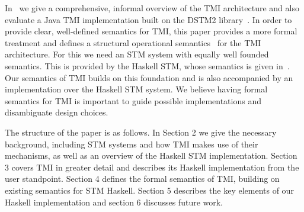 In~\cite{tmi} we give a comprehensive, informal overview of the TMI architecture and also evaluate 
a Java TMI implementation built on the DSTM2 library~\cite{hlm06}.
In order to provide clear, well-defined semantics for TMI, this paper provides a more
formal treatment and defines a structural operational semantics~\cite{plotkin_04_structural} 
for the TMI architecture.
For this we need an STM system with equally well founded semantics. This is provided by the Haskell
STM, whose semantics is given in~\cite{haskellstm}. Our semantics of TMI builds on this foundation
and is also accompanied by an implementation over the Haskell STM system. We believe having formal
semantics for TMI is important to guide possible implementations and disambiguate design choices.

The structure of the paper is as follows. In Section 2 we give the necessary background, including
STM systems and how TMI makes use of their mechanisms, as well as an overview of the Haskell STM
implementation. Section 3 covers TMI in greater detail and describes its Haskell implementation
from the user standpoint. Section 4 defines the formal semantics of TMI, building on existing
semantics for STM Haskell. Section 5 describes the key elements of our Haskell implementation
and section 6 discusses future work.

